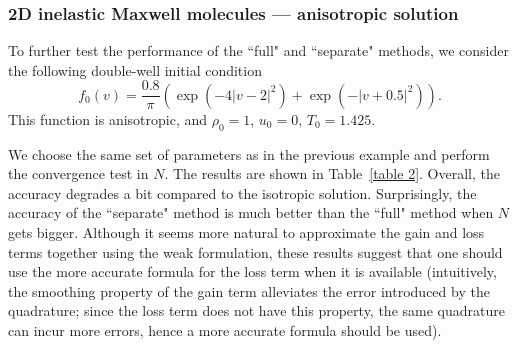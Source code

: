 \documentclass[review,times]{elsarticle}
\begin{document}
\subsubsection{2D inelastic Maxwell molecules --- anisotropic solution}

To further test the performance of the ``full" and ``separate" methods, we consider the following double-well initial condition
\begin{equation}
  f_0(v) = \frac{0.8}{\pi}\left(\exp(-4|v-2|^2) + \exp(-|v+0.5|^2)\right).
\end{equation}
This function is anisotropic, and $\rho_0=1$, $u_0=0$, $T_0=1.425$.

We choose the same set of parameters as in the previous example and perform the convergence test in $N$. The results are shown in Table~\ref{table 2}. Overall, the accuracy degrades a bit compared to the isotropic solution. Surprisingly, the accuracy of the ``separate" method is much better than the ``full" method when $N$ gets bigger. Although it seems more natural to approximate the gain and loss terms together using the weak formulation, these results suggest that one should use the more accurate formula for the loss term when it is available (intuitively, the smoothing property of the gain term \cite{Lions94} alleviates the error introduced by the quadrature; since the loss term does not have this property, the same quadrature can incur more errors, hence a more accurate formula should be used).
\end{document}
